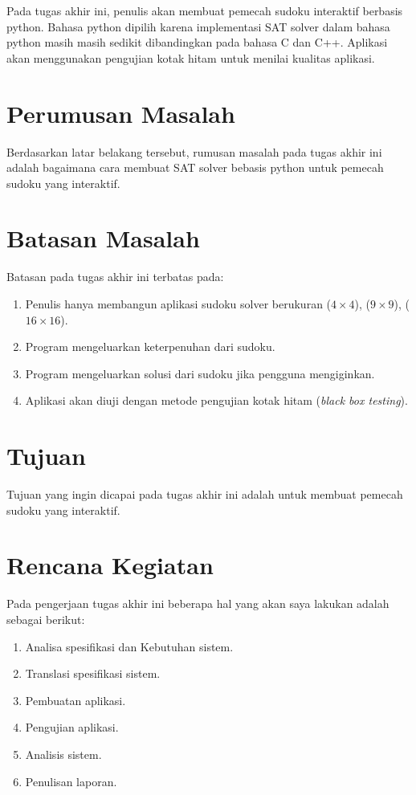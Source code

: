 Pada tugas akhir ini, penulis akan membuat pemecah sudoku interaktif berbasis python. Bahasa python dipilih
karena implementasi SAT solver dalam bahasa python masih masih sedikit dibandingkan pada bahasa C dan C++\cite{SATPy1}. Aplikasi akan menggunakan pengujian kotak hitam untuk menilai kualitas aplikasi\cite{TEST1}.

\section{Perumusan Masalah}

Berdasarkan latar belakang tersebut, rumusan masalah pada tugas akhir ini
adalah bagaimana cara membuat SAT solver bebasis python untuk pemecah sudoku yang interaktif.

\section{Batasan Masalah}

Batasan pada tugas akhir ini terbatas pada:
\begin{enumerate}
	\item Penulis hanya membangun aplikasi sudoku solver berukuran ($4\times4$), ($9\times9$), ($16\times16$).
	\item Program mengeluarkan keterpenuhan dari sudoku.
	\item Program mengeluarkan solusi dari sudoku jika pengguna mengiginkan.
	\item Aplikasi akan diuji dengan metode
	pengujian kotak hitam (\textit{black box testing}).
\end{enumerate}

\section{Tujuan}

Tujuan yang ingin dicapai pada tugas akhir ini adalah untuk membuat pemecah sudoku yang interaktif.

\section{Rencana Kegiatan}

Pada pengerjaan tugas akhir ini beberapa hal yang akan saya lakukan adalah sebagai berikut:
\begin{enumerate}
	\item Analisa spesifikasi dan Kebutuhan sistem.
	\item Translasi spesifikasi sistem.
	\item Pembuatan aplikasi.
	\item Pengujian aplikasi.
	\item Analisis sistem.
	\item Penulisan laporan.
	
\end{enumerate}

